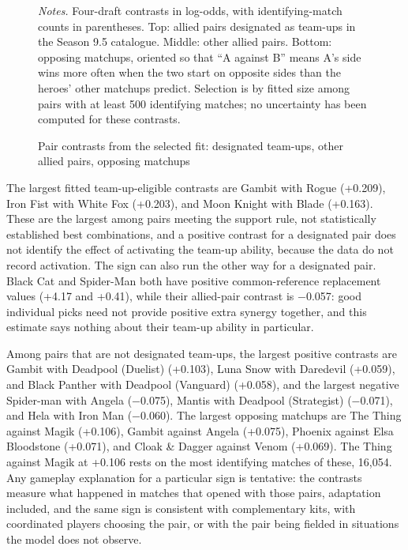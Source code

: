 \documentclass[11pt]{article}
\begin{document}
\begin{figure}[H]\centering
\caption{Pair contrasts from the selected fit: designated team-ups, other allied pairs, opposing matchups}
\label{fig:pairs}
\vspace{2pt}


\begin{minipage}{0.95\linewidth}\footnotesize\vspace{2pt}
\emph{Notes.} Four-draft contrasts in log-odds, with identifying-match counts in parentheses. Top:
allied pairs designated as team-ups in the Season 9.5 catalogue. Middle: other allied pairs. Bottom:
opposing matchups, oriented so that ``A against B'' means A's side wins more often when the two start on
opposite sides than the heroes' other matchups predict. Selection is by fitted size among pairs with at
least 500 identifying matches; no uncertainty has been computed for these contrasts.
\end{minipage}
\end{figure}

The largest fitted team-up-eligible contrasts are Gambit with Rogue (+0.209), Iron Fist with White Fox (+0.203), and Moon Knight with Blade (+0.163). These are the largest among pairs meeting
the support rule, not statistically established best combinations, and a positive contrast for a
designated pair does not identify the effect of activating the team-up ability, because the data do not
record activation. The sign can also run the other way for a designated pair. Black Cat and Spider-Man
both have positive common-reference replacement values (+4.17 and +0.41), while their
allied-pair contrast is $-$0.057: good individual picks need not provide positive extra synergy
together, and this estimate says nothing about their team-up ability in particular.

Among pairs that are not designated team-ups, the largest positive contrasts are Gambit with Deadpool (Duelist) (+0.103), Luna Snow with Daredevil (+0.059), and Black Panther with Deadpool (Vanguard) (+0.058), and the
largest negative Spider-man with Angela ($-$0.075), Mantis with Deadpool (Strategist) ($-$0.071), and Hela with Iron Man ($-$0.060). The largest opposing matchups are The Thing against Magik (+0.106), Gambit against Angela (+0.075), Phoenix against Elsa Bloodstone (+0.071), and Cloak \& Dagger against Venom (+0.069). The Thing against Magik at
+0.106 rests on the most identifying matches of these, 16,054. Any gameplay explanation for a
particular sign is tentative: the contrasts measure what happened in matches that opened with those pairs,
adaptation included, and the same sign is consistent with complementary kits, with coordinated players
choosing the pair, or with the pair being fielded in situations the model does not observe.
\end{document}
